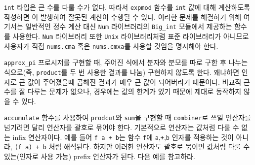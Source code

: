 
 \texttt{int} 타입은 큰 수를 다룰 수가 없다. 따라서 \texttt{expmod}
함수를 \texttt{int} 값에 대해 계산하도록 작성하면 이
발생하여 잘못된 계산이 수행될 수 있다. 이러한 문제를 해결하기 위해 여기서는
일반적인 정수 계산 대신 \texttt{Num} 라이브러리의 \texttt{Big\_int} 모듈에서
제공하는 함수를 사용한다. \texttt{Num} 라이브러리 또한 \texttt{Unix}
라이브러리처럼 표준 라이브러리가 아니므로 사용자가 직접 \texttt{nums.cma} 혹은
\texttt{nums.cmxa}를 사용할 것임을 명시해야 한다.







\texttt{approx\_pi} 프로시저를 구현할 때, 주어진 식에서 분자와 분모를 따로
구한 후 나누는 식으로(즉, \texttt{product}를 두 번 사용한 결과를 나눔) 구현하지
않도록 한다. 왜냐하면 인자로 큰 값이 주어졌을때 곱해진 결과가 매우 큰 값이
되어버리기 때문이다. 비교적 큰 수를 잘 다루는  문제가 없으나,
 경우에는 값의 한계가 있기 때문에 제대로 동작하지 않을 수 있다.


\texttt{accumulate} 함수를 사용하여 \texttt{prodcut}와 \texttt{sum}을 구현할
때 \texttt{combiner}로 쓰일 연산자를 넘기려면  달리 연산자를
괄호로 묶어야 한다. 기본적으로  연산자는 값처럼 다룰 수 없는
infix 연산자이다. 예를 들어 \texttt{f a + b}는 함수 \texttt{f}에
\texttt{a},\texttt{+},\texttt{b} 인자를 적용하는 것이 아니라, \texttt{(f a) +
  b} 처럼 해석된다. 하지만 이러한 연산자도 괄호로 묶이면 값처럼 다룰 수
있는(인자로 사용 가능) prefix 연산자가 된다. 다음 예를 참고하라.

